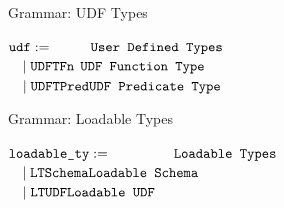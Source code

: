 \begin{frame}{Grammar: UDF Types}
\centering
	\begin{flushleft}
	$ \texttt{udf} := \hfill \quad\quad\:\:\:\texttt{User Defined Types}\hfill$\\
	$ \quad \mid \texttt{UDFTFn}\hfill \:\:\texttt{UDF Function Type}\hfill$\\
   	$ \quad \mid \texttt{UDFTPred} \hfill \texttt{UDF Predicate Type}\hfill$\\
	\end{flushleft}
\end{frame}

\begin{frame}{Grammar: Loadable Types}
\centering
	\begin{flushleft}
	$ \texttt{loadable\_ty} := \quad\quad\quad\quad\:\: \texttt{Loadable Types}\hfill$\\
	$ \quad \mid \texttt{LTSchema}\hfill \texttt{Loadable Schema}\hfill$\\
   	$ \quad \mid \texttt{LTUDF} \hfill \texttt{Loadable UDF}\hfill$\\
	\end{flushleft}
\end{frame}

